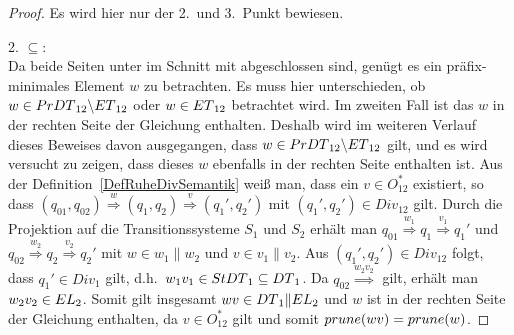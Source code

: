 \begin{proof} Es wird hier nur der 2.\ und 3.\ Punkt bewiesen.

  2. \glqq{}$\subseteq$\grqq{}:\\
  Da beide Seiten unter \cont{} im Schnitt mit \EL{} abgeschlossen sind, genügt
  es ein präfix-minimales Element $w$ zu betrachten. Es muss hier unterschieden, ob $w\in
  PrDT{}_{12}\backslash ET{}_{12}$ oder $w\in ET{}_{12}$ betrachtet wird. Im
  zweiten Fall ist das $w$ in der rechten Seite der Gleichung enthalten.
  Deshalb wird im weiteren Verlauf dieses Beweises davon ausgegangen, dass
  $w\in PrDT{}_{12}\backslash ET{}_{12}$ gilt, und es wird versucht zu
  zeigen, dass dieses $w$ ebenfalls in der rechten Seite enthalten ist. Aus der
  Definition~\ref{DefRuheDivSemantik} weiß man, dass ein $v\in O^*_{12}$
  existiert, so dass $(q_{01},q_{02}) \overset{w}{\Rightarrow} (q_1,q_2)
  \overset{v}{\Rightarrow} (q_1',q_2')$ mit $(q_1',q_2')\in Div_{12}$ gilt.
  Durch die Projektion auf die Transitionssysteme $S_1$ und $S_2$ erhält man
  $q_{01} \overset{w_1}{\Rightarrow} q_1 \overset{v_1}{\Rightarrow} q_1'$ und
  $q_{02} \overset{w_2}{\Rightarrow} q_2 \overset{v_2}{\Rightarrow} q_2'$ mit
  $w\in w_1\|w_2$ und $v\in v_1\|v_2$. Aus $(q_1',q_2')\in Div_{12}$ folgt,
  dass \oBdA{} $q_1'\in Div_1$ gilt, d.h.\ $w_1v_1\in StDT{}_1\subseteq
  DT{}_1$. Da $q_{02} \overset{w_2v_2}{\Rightarrow}$ gilt, erhält man
  $w_2v_2\in EL_2$. Somit gilt insgesamt $wv\in DT{}_1\|EL{}_2$ und $w$ ist
  in der rechten Seite der Gleichung enthalten, da $v\in O_{12}^*$ gilt und
  somit $prune{}(wv)=prune{}(w)$.


\end{proof}
